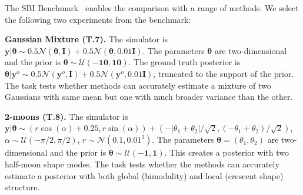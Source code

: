 \documentclass[twoside]{article}
\newcommand{\thb}{\boldsymbol{\theta}}
\newcommand{\yb}{\mathbf{y}}
\newcommand{\data}{\mathbf{y}^o}
\newcommand{\rromc}{R2OMC}
\begin{document}
The SBI Benchmark~\citep{lueckmann2021benchmarking} enables the comparison with a range of methods. We select the following two experiments from the benchmark:
%

\textbf{Gaussian Mixture (T.7).}
The simulator is $\yb|\thb \sim 0.5\mathcal{N}(\thb, \mathbf{I}) + 0.5 \mathcal{N}(\thb, 0.01 \mathbf{I})$. The parameters $\thb$ are two-dimensional and the prior is $\thb \sim \mathcal{U}(\mathbf{-10}, \mathbf{10})$. The ground truth posterior is $\thb|\data \sim 0.5 \mathcal{N}(\data, \mathbf{I}) + 0.5 \mathcal{N}(\data,0.01 \mathbf{I})$, truncated to the support of the prior. The task tests whether methods can accurately estimate a mixture of two Gaussians with same mean but one with much broader variance than the other.

\textbf{2-moons (T.8).}
The simulator is $\yb|\thb \sim  (r\cos(\alpha) + 0.25, r \sin(\alpha)) + (-|\theta_1 + \theta_2| / \sqrt{2}, (-\theta_1 + \theta_2) / \sqrt{2})$, $\alpha \sim \mathcal{U}(-\pi/2, \pi/2)$, $r \sim \mathcal{N}(0.1, 0.01^2)$.
The parameters $\thb=(\theta_1, \theta_2)$ are two-dimensional and the prior is $\thb \sim \mathcal{U}(\mathbf{-1}, \mathbf{1})$. This creates a posterior with two half-moon shape modes. %
The task tests whether the methods can accurately estimate a posterior with both global (bimodality) and local (crescent shape) structure.

\end{document}
